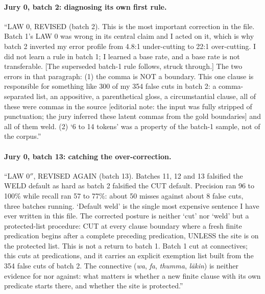 \documentclass[11pt]{article}
\begin{document}
\paragraph{Jury 0, batch 2: diagnosing its own first rule.}
\begin{tcolorbox}[colback=white, boxrule=0.4pt, left=3pt, right=3pt, top=3pt, bottom=3pt]
\scriptsize
``LAW 0, REVISED (batch 2). This is the most important correction in the file. Batch 1's
LAW 0 was wrong in its central claim and I acted on it, which is why batch 2 inverted my
error profile from 4.8:1 under-cutting to 22:1 over-cutting. I did not learn a rule in
batch 1; I learned a base rate, and a base rate is not transferable. [The superseded
batch-1 rule follows, struck through.] The two errors in that paragraph: (1) the comma is
NOT a boundary. This one clause is responsible for something like 300 of my 354 false
cuts in batch 2: a comma-separated list, an appositive, a parenthetical gloss, a
circumstantial clause, all of these were commas in the source [editorial note: the input
was fully stripped of punctuation; the jury inferred these latent commas from the gold
boundaries] and all of them weld. (2) `6 to 14 tokens' was a property of the batch-1
sample, not of the corpus.''
\end{tcolorbox}
\paragraph{Jury 0, batch 13: catching the over-correction.}
\begin{tcolorbox}[colback=white, boxrule=0.4pt, left=3pt, right=3pt, top=3pt, bottom=3pt]
\scriptsize
``LAW 0$''$, REVISED AGAIN (batch 13). Batches 11, 12 and 13 falsified the WELD default
as hard as batch 2 falsified the CUT default. Precision ran 96 to 100\% while recall ran
57 to 77\%: about 50 misses against about 8 false cuts, three batches running. `Default
weld' is the single most expensive sentence I have ever written in this file. The
corrected posture is neither `cut' nor `weld' but a protected-list procedure: CUT at
every clause boundary where a fresh finite predication begins after a complete preceding
predication, UNLESS the site is on the protected list. This is not a return to batch 1.
Batch 1 cut at connectives; this cuts at predications, and it carries an explicit
exemption list built from the 354 false cuts of batch 2. The connective (\textit{wa},
\textit{fa}, \textit{thumma}, \textit{l\={a}kin}) is neither evidence for nor against:
what matters is whether a new finite clause with its own predicate starts there, and
whether the site is protected.''
\end{tcolorbox}
\end{document}
